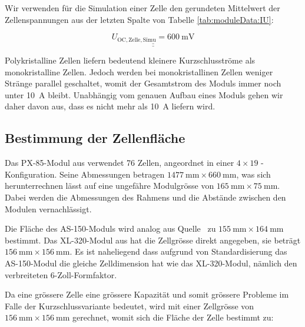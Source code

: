 Wir verwenden f\"ur  die Simulation einer Zelle den  gerundeten Mittelwert der
Zellenspannungen aus der letzten Spalte von Tabelle \ref{tab:moduleData:IU}:

\begin{equation}
    \label{eq:cell:UOC}
    \underline{\underline{U_{\mathrm{OC, Zelle, Simu}} = \SI{600}{\milli\volt}}}
\end{equation}

Polykristalline  Zellen  liefern  bedeutend  kleinere  Kurzschlusstr\"ome  als
monokristalline  Zellen.  Jedoch  werden bei  monokristallinen Zellen  weniger
Str\"ange parallel  geschaltet, womit  der Gesamtstrom  des Moduls  immer noch
unter \SI{10}{\ampere}  bleibt. Unabh\"angig vom  genauen Aufbau  eines Moduls
gehen wir  daher davon aus,  dass es  nicht mehr als  \SI{10}{\ampere} liefern
wird.


\subsection{Bestimmung der Zellenfl\"ache}
\label{app:subsec:cell:surface}

Das    PX-85-Modul   aus    \cite{ref:solar:px85}    verwendet   76    Zellen,
angeordnet  in   einer  $4  \times  19$   -  Konfiguration. Seine  Abmessungen
betragen   $\SI{1477}{\milli\meter}    \times   \SI{660}{\milli\meter}$,   was
sich   herunterrechnen  l\"asst   auf  eine   ungef\"ahre  Modulgr\"osse   von
$\SI{165}{\milli\meter}   \times   \SI{75}{\milli\meter}$. Dabei  werden   die
Abmessungen   des   Rahmens   und   die  Abst\"ande   zwischen   den   Modulen
vernachl\"assigt.

Die Fl\"ache  des AS-150-Moduls wird analog  aus Quelle~\cite{ref:solar:as150}
zu  $\SI{155}{\milli\meter}  \times   \SI{164}{\milli\meter}$  bestimmt.   Das
XL-320-Modul   aus   \cite{ref:solar:sunmodulePro}    hat   die   Zellgr\"osse
direkt    angegeben,    sie     betr\"agt    $\SI{156}{\milli\meter}    \times
\SI{156}{\milli\meter}$. Es ist naheliegend dass aufgrund von Standardisierung
das AS-150-Modul die gleiche Zelldimension hat wie das XL-320-Modul, n\"amlich
den verbreiteten 6-Zoll-Formfaktor.

Da  eine gr\"ossere  Zelle eine  gr\"ossere Kapazit\"at  und somit  gr\"ossere
Probleme   im  Falle   der  Kurzschlussvariante   bedeutet,  wird   mit  einer
Zellgr\"osse   von   $\SI{156}{\milli\meter}  \times   \SI{156}{\milli\meter}$
gerechnet, womit sich die Fl\"ache der Zelle bestimmt zu:

